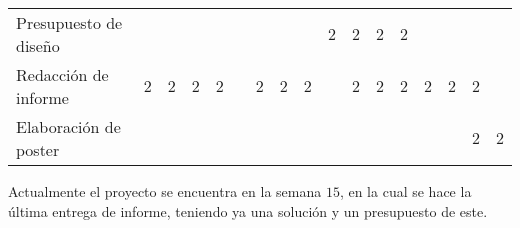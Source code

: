 \begin{table}[H]
{\begin{tabular}{|l|llllllllllllllll|}
Presupuesto de diseño &  &  &  &  &  &  &  &   & \cellcolor[HTML]{C0504D}$2$ & \cellcolor[HTML]{C0504D}$2$ & \cellcolor[HTML]{C0504D}$2$ & \cellcolor[HTML]{C0504D}$2$ &  &  & \multicolumn{1}{|l|}{} &  \\
Redacción de informe & \cellcolor[HTML]{9BBB59}$2$ & \cellcolor[HTML]{9BBB59}$2$ & {\cellcolor[HTML]{9BBB59}$2$} & {\cellcolor[HTML]{9BBB59}$2$} &  & \cellcolor[HTML]{9BBB59}$2$ & {\cellcolor[HTML]{9BBB59}$2$} & {\cellcolor[HTML]{9BBB59}$2$} &  & \cellcolor[HTML]{9BBB59}
$2$ & \cellcolor[HTML]{9BBB59}$2$ & \cellcolor[HTML]{9BBB59}$2$ & {\cellcolor[HTML]{9BBB59}$2$} & \cellcolor[HTML]{9BBB59}$2$ & \multicolumn{1}{|l|}{\cellcolor[HTML]{9BBB59}$2$} &  \\
Elaboración de poster &  &  &  &  &  &  &  &  &  &  &  &  &  &  & \multicolumn{1}{|l|}{\cellcolor[HTML]{538DD5}$2$} & \cellcolor[HTML]{538DD5}$2$ \\ \hline
\end{tabular}%
}
\end{table}
\noindent Actualmente el proyecto se encuentra en la semana $15$, en la cual se hace la última entrega de informe, teniendo ya una solución y un presupuesto de este.